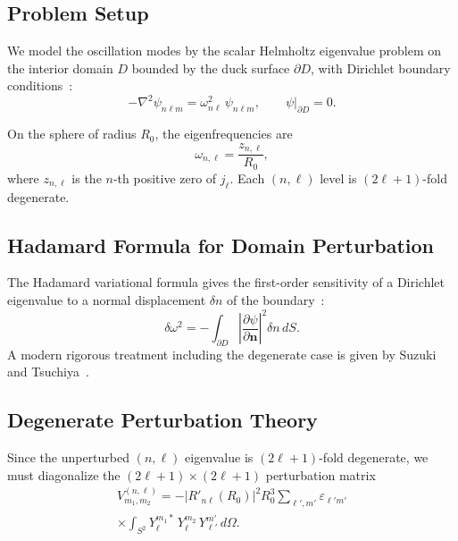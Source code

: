 \documentclass[aps,prd,twocolumn,superscriptaddress,nofootinbib]{revtex4-2}
\begin{document}
\subsection{Problem Setup}
\label{sec:qnm_setup}

We model the oscillation modes by the scalar Helmholtz eigenvalue problem on
the interior domain $D$ bounded by the duck surface $\partial D$, with
Dirichlet boundary conditions~\cite{KokkotasSchmidt1999, Cowling1941}:
\begin{equation}
-\nabla^2 \psi_{n\ell m} = \omega_{n\ell}^2 \, \psi_{n\ell m}, \qquad
\psi \big|_{\partial D} = 0.
\label{eq:helmholtz}
\end{equation}

On the sphere of radius $R_0$, the eigenfrequencies are
\begin{equation}
\omega_{n,\ell} = \frac{z_{n,\ell}}{R_0},
\label{eq:sphere_eigenfreq}
\end{equation}
where $z_{n,\ell}$ is the $n$-th positive zero of $j_\ell$.
Each $(n,\ell)$ level is $(2\ell+1)$-fold degenerate.


\subsection{Hadamard Formula for Domain Perturbation}
\label{sec:hadamard}

The Hadamard variational formula gives the first-order sensitivity of a
Dirichlet eigenvalue to a normal displacement $\delta n$ of the
boundary~\cite{Hadamard1910, HenryDouanla2015}:
\begin{equation}
\delta \omega^2 = -\int_{\partial D} \left| \frac{\partial \psi}{\partial
\mathbf{n}} \right|^2 \delta n \, dS.
\label{eq:hadamard}
\end{equation}
A modern rigorous treatment including the degenerate case is given by
Suzuki and Tsuchiya~\cite{SuzukiTsuchiya2023}.


\subsection{Degenerate Perturbation Theory}
\label{sec:degen_pert}

Since the unperturbed $(n,\ell)$ eigenvalue is $(2\ell+1)$-fold degenerate,
we must diagonalize the $(2\ell+1) \times (2\ell+1)$ perturbation matrix
\begin{multline}
V_{m_1, m_2}^{(n,\ell)} = -\left| R'_{n\ell}(R_0) \right|^2 R_0^3
\sum_{\ell',m'} \varepsilon_{\ell' m'} \\
\times \int_{S^2} Y_\ell^{m_1 *} \, Y_\ell^{m_2} \, Y_{\ell'}^{m'} \,
d\Omega.
\label{eq:perturbation_matrix}
\end{multline}
\end{document}
